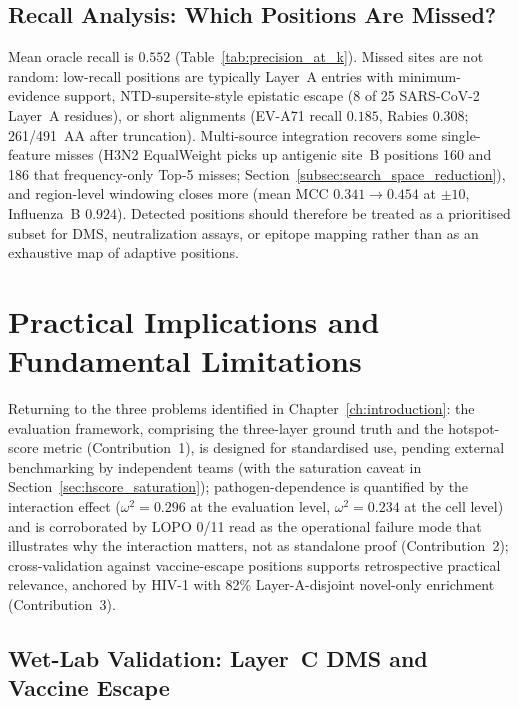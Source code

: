 \subsection{Recall Analysis: Which Positions Are Missed?}
\label{sec:recall_analysis}

Mean oracle recall is $0.552$ (Table~\ref{tab:precision_at_k}). Missed sites are not random: low-recall positions are typically Layer~A entries with minimum-evidence support, NTD-supersite-style epistatic escape (8 of 25 SARS-CoV-2 Layer~A residues), or short alignments (EV-A71 recall $0.185$, Rabies $0.308$; 261/491~AA after truncation). Multi-source integration recovers some single-feature misses (H3N2 EqualWeight picks up antigenic site~B positions 160 and 186 that frequency-only Top-5 misses; Section~\ref{subsec:search_space_reduction}), and region-level windowing closes more (mean MCC $0.341\to0.454$ at $\pm10$, Influenza~B $0.924$). Detected positions should therefore be treated as a prioritised subset for DMS, neutralization assays, or epitope mapping rather than as an exhaustive map of adaptive positions.

\section{Practical Implications and Fundamental Limitations}

Returning to the three problems identified in Chapter~\ref{ch:introduction}: the evaluation framework, comprising the three-layer ground truth and the hotspot-score metric (Contribution~1), is designed for standardised use, pending external benchmarking by independent teams (with the saturation caveat in Section~\ref{sec:hscore_saturation}); pathogen-dependence is quantified by the interaction effect ($\omega^2 = 0.296$ at the evaluation level, $\omega^2 = 0.234$ at the cell level) and is corroborated by LOPO 0/11 read as the operational failure mode that illustrates why the interaction matters, not as standalone proof (Contribution~2); cross-validation against vaccine-escape positions supports retrospective practical relevance, anchored by HIV-1 with 82\% Layer-A-disjoint novel-only enrichment (Contribution~3).

\subsection{Wet-Lab Validation: Layer~C DMS and Vaccine Escape}
\label{sec:vaccine_escape}

